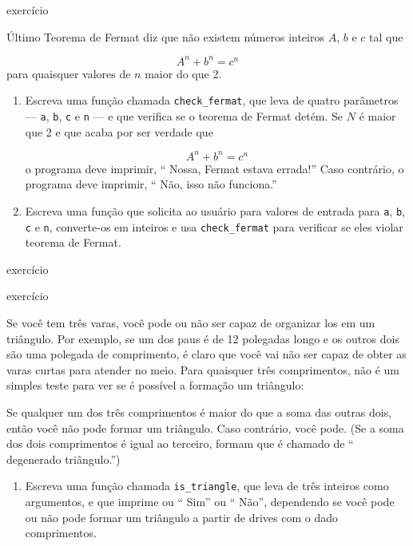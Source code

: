 \documentclass[10pt]{book}
\begin{document}
{{\begin{} exercício

Último Teorema de Fermat diz que não existem números inteiros
$ A $, $ b $ e $ c $ tal que

\[A ^ n + b ^ n = c ^ n \]
%
para quaisquer valores de $ n $ maior do que 2.

\begin{enumerate}

\item Escreva uma função chamada \verb "check_fermat", que leva de quatro
parâmetros --- {\tt a}, {\tt b}, {\tt c} e {\tt n} --- e
que verifica se o teorema de Fermat detém. Se
$ N $ é maior que 2 e que acaba por ser verdade que 

\[A ^ n + b ^ n = c ^ n \]
%
o programa deve imprimir, `` Nossa, Fermat estava errada!''
Caso contrário, o programa deve imprimir, `` Não, isso não funciona.''

\item Escreva uma função que solicita ao usuário para valores de entrada
para {\tt a}, {\tt b}, {\tt c} e {\tt n}, converte-os em
inteiros e usa \verb "check_fermat" para verificar se eles
violar teorema de Fermat.

\end{enumerate}

\end{} exercício


\begin{} exercício

Se você tem três varas, você pode ou não ser capaz de organizar
los em um triângulo. Por exemplo, se um dos paus é de 12 polegadas
longo e os outros dois são uma polegada de comprimento, é claro que você vai
não ser capaz de obter as varas curtas para atender no meio. Para quaisquer
três comprimentos, não é um simples teste para ver se é possível a formação
um triângulo:

\begin{citação}
Se qualquer um dos três comprimentos é maior do que a soma das outras
  dois, então você não pode formar um triângulo. Caso contrário, você
  pode. (Se a soma dos dois comprimentos é igual ao terceiro, formam
    que é chamado de `` degenerado triângulo.'')
\end{citação}

\begin{enumerate}

\item Escreva uma função chamada \verb "is_triangle", que leva de três
  inteiros como argumentos, e que imprime ou `` Sim'' ou `` Não'', dependendo
  se você pode ou não pode formar um triângulo a partir de drives com o
  dado comprimentos.


\end{enumerate}
\end{}}}
\end{document}
